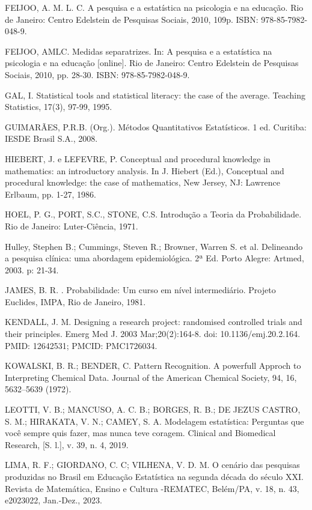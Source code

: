 FEIJOO, A. M. L. C. A pesquisa e a estatística na psicologia e na educação. Rio de Janeiro:
Centro Edelstein de Pesquisas Sociais, 2010, 109p. ISBN: 978-85-7982-048-9.\vskip0.3cm

FEIJOO, AMLC. Medidas separatrizes. In: A pesquisa e a estatística na psicologia e na educação
[online]. Rio de Janeiro: Centro Edelstein de Pesquisas Sociais, 2010, pp. 28-30. ISBN: 978-85-7982-048-9.\vskip0.3cm

GAL, I. Statistical tools and statistical literacy: the case of the average. Teaching
Statistics, 17(3), 97-99, 1995.\vskip0.3cm

GUIMARÃES, P.R.B. (Org.). Métodos Quantitativos Estatísticos. 1 ed. Curitiba: IESDE Brasil S.A., 2008. \vskip0.3cm

HIEBERT, J. e LEFEVRE, P. Conceptual and procedural knowledge in mathematics: an
introductory analysis. In J. Hiebert (Ed.), Conceptual and procedural knowledge: the
case of mathematics, New Jersey, NJ: Lawrence Erlbaum, pp. 1-27, 1986.\vskip0.3cm

HOEL, P. G., PORT, S.C., STONE, C.S. Introdução a Teoria da Probabilidade. Rio de
Janeiro: Luter-Ciência, 1971.\vskip0.3cm

Hulley, Stephen B.; Cummings, Steven R.; Browner, Warren S. et al. Delineando a pesquisa clínica: uma abordagem epidemiológica. 2ª Ed. Porto Alegre: Artmed, 2003. p: 21-34.\vskip0.3cm

JAMES, B. R. . Probabilidade: Um curso em nível intermediário.
Projeto Euclides, IMPA, Rio de Janeiro, 1981. \vskip0.3cm

KENDALL, J. M. Designing a research project: randomised controlled trials and their principles. Emerg Med J. 2003 Mar;20(2):164-8. doi: 10.1136/emj.20.2.164. PMID: 12642531; PMCID: PMC1726034.\vskip0.3cm

KOWALSKI, B. R.; BENDER, C. Pattern Recognition. A powerfull Approch to Interpreting Chemical Data. Journal of the American Chemical Society, 94, 16, 5632–5639 (1972).\vskip0.3cm

LEOTTI, V. B.; MANCUSO, A. C. B.; BORGES, R. B.; DE JEZUS CASTRO, S. M.; HIRAKATA, V. N.; CAMEY, S. A. Modelagem estatística: Perguntas que você sempre quis fazer, mas nunca teve coragem. Clinical and Biomedical Research, [S. l.], v. 39, n. 4, 2019.\vskip0.3cm

LIMA, R. F.; GIORDANO, C. C; VILHENA,  V. D. M. O cenário das  pesquisas produzidas no   Brasil   em   Educação   Estatística   na   segunda   década   do   século   XXI. Revista   de Matemática, Ensino e Cultura -REMATEC, Belém/PA, v. 18, n. 43, e2023022, Jan.-Dez., 2023.\vskip0.3cm

